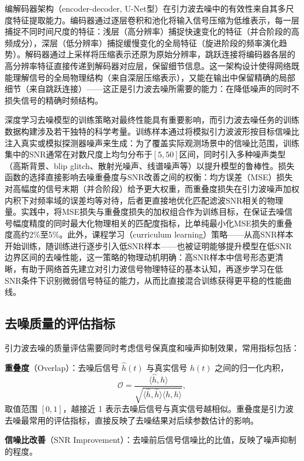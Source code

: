 编解码器架构（encoder-decoder, U-Net型）在引力波去噪中的有效性来自其多尺度特征提取能力。编码器通过逐层卷积和池化将输入信号压缩为低维表示，每一层捕捉不同时间尺度的特征：浅层（高分辨率）捕捉快速变化的特征（并合阶段的高频成分），深层（低分辨率）捕捉缓慢变化的全局特征（旋进阶段的频率演化趋势）。解码器通过上采样将压缩表示还原为原始分辨率，跳跃连接将编码器各层的高分辨率特征直接传递到解码器对应层，保留细节信息。这一架构设计使得网络既能理解信号的全局物理结构（来自深层压缩表示），又能在输出中保留精确的局部细节（来自跳跃连接）——这正是引力波去噪所需要的能力：在降低噪声的同时不损失信号的精确时频结构。

深度学习去噪模型的训练策略对最终性能具有重要影响，而引力波去噪任务的训练数据构建涉及若干独特的科学考量。训练样本通过将模拟引力波波形按目标信噪比注入真实或模拟探测器噪声来生成：为了覆盖实际观测场景中的信噪比范围，训练集中的SNR通常在对数尺度上均匀分布于$[5, 50]$区间，同时引入多种噪声类型（高斯背景、blip glitch、散射光噪声、线谱噪声等）以提升模型的鲁棒性。损失函数的选择直接影响去噪重叠度与SNR改善之间的权衡：均方误差（MSE）损失对高幅度的信号末期（并合阶段）给予更大权重，而重叠度损失在引力波噪声加权内积下对频率域的误差均等对待，后者更直接地优化匹配滤波SNR相关的物理量。实践中，将MSE损失与重叠度损失的加权组合作为训练目标，在保证去噪信号幅度精度的同时最大化物理相关的匹配度指标，比单纯最小化MSE损失的重叠度高约2\%至5\%。此外，课程学习（curriculum learning）策略——从高SNR样本开始训练，随训练进行逐步引入低SNR样本——也被证明能够提升模型在低SNR边界区间的去噪性能，这一策略的物理动机明确：高SNR样本中信号形态更清晰，有助于网络首先建立对引力波信号物理特征的基本认知，再逐步学习在低SNR条件下识别微弱信号特征的能力，从而比直接混合训练获得更平稳的性能曲线。

\subsection{去噪质量的评估指标}

引力波去噪的质量评估需要同时考虑信号保真度和噪声抑制效果，常用指标包括：

\textbf{重叠度}（Overlap）：去噪后信号 $\hat{h}(t)$ 与真实信号 $h(t)$ 之间的归一化内积，
\begin{equation}
  \mathcal{O} = \frac{\langle \hat{h}, h\rangle}{\sqrt{\langle \hat{h}, \hat{h}\rangle\langle h, h\rangle}},
\end{equation}
取值范围 $[0, 1]$，越接近 1 表示去噪后信号与真实信号越相似。重叠度是引力波去噪最常用的评估指标，直接反映了去噪结果对后续参数估计的影响。

\textbf{信噪比改善}（SNR Improvement）：去噪前后信号信噪比的比值，反映了噪声抑制的程度。

